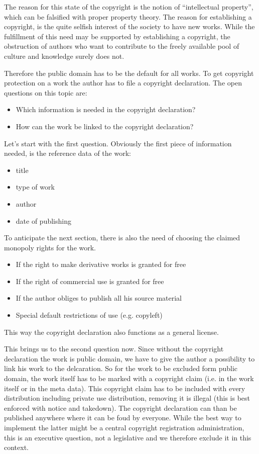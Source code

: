 The reason for this state of the copyright is the notion of ``intellectual property'', which can be falsified with proper property theory. The reason for establishing a copyright, is the quite selfish interest of the society to have new works. While the fulfillment of this need may be supported by establishing a copyright, the obstruction of authors who want to contribute to the freely available pool of culture and knowledge surely does not.

Therefore the public domain has to be the default for all works. To get copyright protection on a work the author has to file a copyright declaration. The open questions on this topic are:
\begin{itemize}
	\item Which information is needed in the copyright declaration?
	\item How can the work be linked to the copyright declaration?
\end{itemize}

Let's start with the first question. Obviously the first piece of information needed, is the reference data of the work:
\begin{itemize}
	\item title
	\item type of work
	\item author
	\item date of publishing
\end{itemize}
To anticipate the next section, there is also the need of choosing the claimed monopoly rights for the work. 
\begin{itemize}
	\item If the right to make derivative works is granted for free
	\item If the right of commercial use is granted for free
	\item If the author obliges to publish all his source material
	\item Special default restrictions of use (e.g. copyleft)
\end{itemize}
This way the copyright declaration also functions as a general license.

This brings us to the second question now. Since without the copyright declaration the work is public domain, we have to give the author a possibility to link his work to the delcaration. So for the work to be excluded form public domain, the work itself has to be marked with a copyright claim (i.e. in the work itself or in the meta data). This copyright claim has to be included with every distribution including private use distribution, removing it is illegal (this is best enforced with notice and takedown). The copyright declaration can than be published anywhere where it can be foud by everyone. While the best way to implement the latter might be a central copyright registration administration, this is an executive question, not a legislative and we therefore exclude it in this context. 

